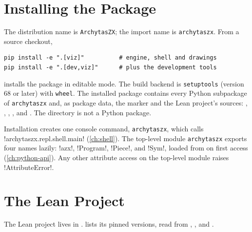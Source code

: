 \section{Installing the Package}\label{sec:install-package}

The distribution name is \texttt{ArchytasZX}; the import name is \texttt{archytaszx}. From a source checkout,
\begin{lstlisting}[style=shell]
pip install -e ".[viz]"          # engine, shell and drawings
pip install -e ".[dev,viz]"      # plus the development tools
\end{lstlisting}
installs the package in editable mode. The build backend is \texttt{setuptools} (version 68 or later) with \texttt{wheel}. The installed package contains every Python subpackage of \texttt{archytaszx} and, as package data, the marker  and the Lean project's sources: , , , , and . The directory  is not a Python package.

Installation creates one console command, \texttt{archytaszx}, which calls \py!archytaszx.repl.shell.main! (\cref{ch:shell}). The top-level module \texttt{archytaszx} exports four names lazily: \py!azx!, \py!Program!, \py!Piece!, and \py!Sym!, loaded from  on first access (\cref{ch:python-api}). Any other attribute access on the top-level module raises \py!AttributeError!.

\section{The Lean Project}\label{sec:install-lean}

The Lean project lives in .  lists its pinned versions, read from , , and .

